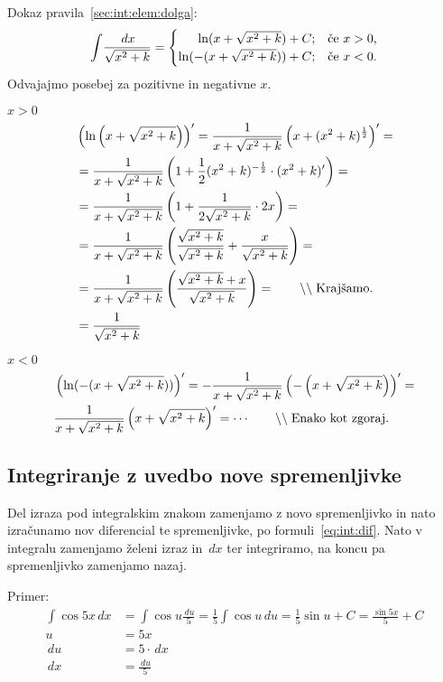 \documentclass[a4paper,oneside,12pt,fleqn]{article}
\newcommand\krat\cdot
\newcommand{\comment}[1]{\ensuremath{\qquad\backslash\backslash\;}\textnormal{#1}}
\def\kos{\cos}
\renewcommand{\d}{\ensuremath{\,d}} %
\newcommand{\dx}{\ensuremath{\d x}}
\newcommand{\du}{\ensuremath{\d u}}
\numberwithin{equation}{section}
\newenvironment{enumerate*}%
{
\vspace{-12pt}%
\begin{enumerate}%
\setlength{\itemsep}{0pt}%
\setlength{\parskip}{2pt}}%
{\end{enumerate}}
\begin{document}
Dokaz pravila~\eqref{sec:int:elem:dolga}: \\
\[ \int\!\frac{\dx}{\sqrt{x^2+k}} = 
\begin{cases}
  \hfill \ln(x+\sqrt{x^2+k}) + C; & \text{če $x > 0$,} \\
  \hfill \ln(-(x+\sqrt{x^2+k})) + C; & \text{če $x < 0$.}
\end{cases} \]
Odvajajmo posebej za pozitivne in negativne $x$.
\begin{enumerate*}
  \item $x > 0$
    \begin{align*}
      & \left( \ln \left(x + \sqrt{x^2 + k}\right)\right)' = 
          \frac{1}{x + \sqrt{x^2 + k}} \left( x+(x^2+k)^{\frac{1}{2}} \right)' = \\
      & = \frac{1}{x + \sqrt{x^2 + k}} \left( 1 + \frac{1}{2}(x^2 + k)^{-\frac{1}{2}} \krat (x^2 + k)' \right) = \\
      & = \frac{1}{x + \sqrt{x^2 + k}} \left( 1 + \frac{1}{2\sqrt{x^2 + k}}\krat 2x \right) = \\
      & = \frac{1}{x + \sqrt{x^2 + k}} \left( \frac{\sqrt{x^2+k}}{\sqrt{x^2+k}} + \frac{x}{\sqrt{x^2 + k}} \right) = \\
      & = \frac{1}{x + \sqrt{x^2 + k}} \left( \frac{\sqrt{x^2 + k} + x}{\sqrt{x^2+k}} \right) = \comment{Krajšamo.} \\
      & = \frac{1}{\sqrt{x^2 + k}}
    \end{align*}
  \item $x < 0$
    \begin{align*}
      & \left( \ln(-(x+\sqrt{x^2+k}))\right)' = 
      -\frac{1}{x+\sqrt{x^2+k}}\left( -\left( x+\sqrt{x^2+k} \right)\right)' = \\
      & \frac{1}{x+\sqrt{x^2+k}}\left(x+\sqrt{x^2+k} \right)' = \cdots \comment{Enako kot zgoraj.}
    \end{align*}
\end{enumerate*}

\subsection{Integriranje z uvedbo nove spremenljivke}
\label{sec:int:subst}
Del izraza pod integralskim znakom zamenjamo z novo spremenljivko in nato izračunamo nov
diferencial te spremenljivke, po formuli~\eqref{eq:int:dif}. Nato v integralu zamenjamo
želeni izraz in $\!\dx$ ter integriramo, na koncu pa spremenljivko zamenjamo nazaj.

Primer:
\begin{align*}
  \int\!\kos5x\dx &= \int\!\kos u\frac{\du}{5} = \frac{1}{5}\!\int\!\kos u \du =
  \frac{1}{5} \sin u + C = \frac{\sin 5x}{5} + C \\
  u &= 5x \\
  \du &= 5\krat \dx \\
  \dx &= \frac{\du}{5} 
\end{align*}
\end{document}

